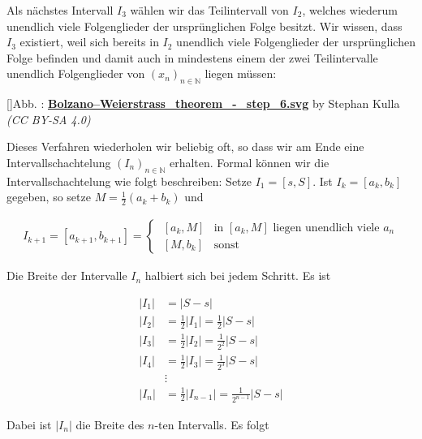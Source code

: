 \documentclass[fontsize=9pt,
               parskip=half-,
               DIV=14,
               listof=chapterentry,
               tocflat]{scrbook}
\newcounter{imagelabel}
\begin{document}
\begin{proof*}
Als nächstes Intervall $I_{3}$ wählen wir das Teilintervall von $I_{2}$, welches wiederum unendlich viele Folgenglieder der ursprünglichen Folge besitzt. Wir wissen, dass $I_{3}$ existiert, weil sich bereits in $I_{2}$ unendlich viele Folgenglieder der ursprünglichen Folge befinden und damit auch in mindestens einem der zwei Teilintervalle unendlich Folgenglieder von $(x_{n})_{n\in \mathbb {N} }$ liegen müssen:

[]{Abb. : \protect\href{https://commons.wikimedia.org/wiki/File:Bolzano–Weierstrass_theorem_-_step_6.svg}{\textbf{Bolzano–Weierstrass\allowbreak\_theorem\allowbreak\_\allowbreak-\allowbreak\_step\allowbreak\_6.svg}} by Stephan Kulla \textit{(CC BY-SA 4.0)}}\begin{center}
\end{center}

Dieses Verfahren wiederholen wir beliebig oft, so dass wir am Ende eine Intervallschachtelung $(I_{n})_{n\in \mathbb {N} }$ erhalten. Formal können wir die Intervallschachtelung wie folgt beschreiben: Setze $I_{1}=[s,S]$. Ist $I_{k}=[a_{k},b_{k}]$ gegeben, so setze $M={\tfrac {1}{2}}(a_{k}+b_{k})$ und

\begin{align*}
I_{k+1}=[a_{k+1},b_{k+1}]={\begin{cases}\;[a_{k},M]&{\text{in }}[a_{k},M]{\text{ liegen unendlich viele }}a_{n}\\\;[M,b_{k}]&{\text{sonst}}\end{cases}}
\end{align*}

Die Breite der Intervalle $I_{n}$ halbiert sich bei jedem Schritt. Es ist

\begin{align*}
|I_{1}|&=|S-s|\\|I_{2}|&={\frac {1}{2}}|I_{1}|={\frac {1}{2}}|S-s|\\|I_{3}|&={\frac {1}{2}}|I_{2}|={\frac {1}{2^{2}}}|S-s|\\|I_{4}|&={\frac {1}{2}}|I_{3}|={\frac {1}{2^{3}}}|S-s|\\&\vdots \\|I_{n}|&={\frac {1}{2}}|I_{n-1}|={\frac {1}{2^{n-1}}}|S-s|
\end{align*}

Dabei ist $|I_{n}|$ die Breite des $n$-ten Intervalls. Es folgt


\end{proof*}
\end{document}

